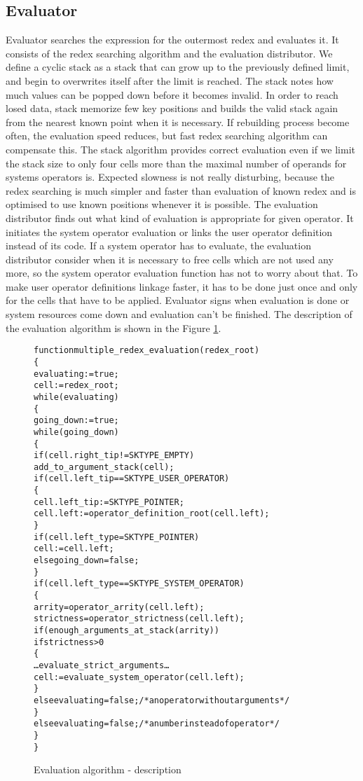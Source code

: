 \documentclass{article}
\begin{document}
\subsection{Evaluator}
Evaluator searches the expression for the outermost redex and evaluates
it. It consists of the redex searching algorithm and the evaluation
distributor. We define a cyclic stack as a stack that can grow up to
the previously defined limit, and begin to overwrites itself after the
limit is reached. The stack notes how much values can be popped down
before it becomes invalid. In order to reach losed data, stack memorize
few key positions and builds the valid stack again from the nearest
known point when it is necessary. If rebuilding process become often,
the evaluation speed reduces, but fast redex searching algorithm can
compensate this. The stack algorithm provides correct evaluation even
if we limit the stack size to only four cells more than the maximal
number of operands for systems operators is. Expected slowness is not
really disturbing, because the redex searching is much simpler and
faster than evaluation of known redex and is optimised to use known
positions whenever it is possible. The evaluation distributor finds
out what kind of evaluation is appropriate for given operator. It
initiates the system operator evaluation or links the user operator
definition instead of its code. If a system operator has to evaluate,
the evaluation distributor consider when it is necessary to free
cells which are not used any more, so the system operator evaluation
function has not to worry about that. To make user operator definitions
linkage faster, it has to be done just once and only for the cells that
have to be applied. Evaluator signs when evaluation is done or system
resources come down and evaluation can't be finished. The description
of the evaluation algorithm is shown in the Figure \ref{fig:descr}.
\begin{figure}[ht]
\begin{alltt}
function multiple_redex_evaluation( redex_root )
\{
   evaluating := true;
   cell := redex_root;
   while(evaluating)
     \{
      going_down := true;
      while(going_down)
        \{
         if (cell.right_tip != SKTYPE_EMPTY)
            add_to_argument_stack( cell );
         if (cell.left_tip == SKTYPE_USER_OPERATOR)
            \{
              cell.left_tip := SKTYPE_POINTER;
              cell.left := operator_definition_root(cell.left);
            \}
         if (cell.left_type = SKTYPE_POINTER)
            cell := cell.left;
            else going_down = false;
        \}
      if (cell.left_type == SKTYPE_SYSTEM_OPERATOR)
        \{
         arrity = operator_arrity( cell.left );
         strictness = operator_strictness( cell.left );
         if (enough_arguments_at_stack( arrity ))
            if strictness>0
              \{
               \ldots evaluate_strict_arguments\ldots
               cell := evaluate_system_operator( cell.left );
              \}
              else evaluating = false; /* an operator without arguments */
        \}
         else evaluating = false; /* a number instead of operator */
     \}
\}
\end{alltt}
\caption{Evaluation algorithm - description}
\label{fig:descr}
\end{figure}
\end{document}
